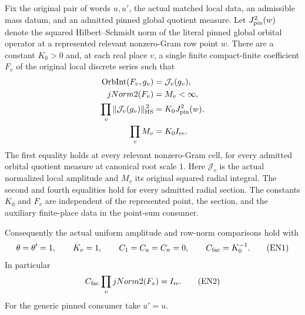 \begin{theorem}
\label{thm:flag-exact-norm-comparison}
Fix the original pair of words \(u,u'\), the actual
matched local data, an admissible mass datum, and an
admitted pinned global quotient measure. Let
\(J_{\rm pin}^2(w)\) denote the squared Hilbert--Schmidt
norm of the literal pinned global orbital operator at
a represented relevant nonzero-Gram row point \(w\).
There are a constant \(K_0>0\) and, at each real place
\(v\), a single finite compact-finite coefficient \(F_v\)
of the original local discrete series such that
\begin{align}
 \mathrm{OrbInt}(F_v,g_v)
       &=\mathcal J_v(g_v),                         \label{eq:flag-exact-local}\\
 jNorm2(F_v)&=M_v<\infty,                            \label{eq:flag-exact-radial}\\
 \prod_v\|\mathcal J_v(g_v)\|_{\rm HS}^{\,2}
       &=K_0J_{\rm pin}^2(w),                       \label{eq:flag-exact-point}\\
 \prod_v M_v&=K_0I_{\rm re}.                        \label{eq:flag-exact-row}
\end{align}
The first equality holds at every relevant nonzero-Gram
cell, for every admitted orbital quotient measure at
canonical root scale \(1\). Here \(\mathcal J_v\) is the
actual normalized local amplitude and \(M_v\) its original
squared radial integral. The second and fourth equalities
hold for every admitted radial section. The constants
\(K_0\) and \(F_v\) are independent of the represented
point, the section, and the auxiliary finite-place data
in the point-sum consumer.

Consequently the actual uniform amplitude and row-norm
comparisons hold with
\[
 \theta=\theta'=1,\qquad K_v=1,\qquad
 C_1=C_a=C_n=0,\qquad C_{\rm fac}=K_0^{-1}.
                                                        \tag{EN1}
\]
In particular
\[
 C_{\rm fac}\prod_vjNorm2(F_v)=I_{\rm re}.
                                                        \tag{EN2}
\]
For the generic pinned consumer take \(u'=u\).
\end{theorem}

